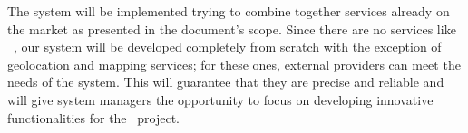 The system will be implemented trying to combine together services already on the market as presented in the document's scope. Since there are no services like \projectname~, our system will be developed completely from scratch with the exception of geolocation and mapping services; for these ones, external providers can meet the needs of the system. This will guarantee that they are precise and reliable and will give system managers the opportunity to focus on developing innovative functionalities for the \projectname~project.